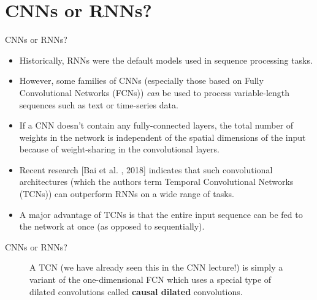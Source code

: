 \documentclass[11pt,compress,t,notes=noshow]{beamer}
\begin{document}
\section{CNNs or RNNs?}

\begin{frame} {CNNs or RNNs?}
  \begin{itemize}
    \item Historically, RNNs were the default models used in sequence processing tasks.
    \item However, some families of CNNs (especially those based on Fully Convolutional Networks (FCNs)) \textit{can} be used to process variable-length sequences such as text or time-series data.
    \item If a CNN doesn't contain any fully-connected layers, the total number of weights in the network is independent of the spatial dimensions of the input because of weight-sharing in the convolutional layers.
    \item Recent research [Bai et al. , 2018] indicates that such convolutional architectures (which the authors term Temporal Convolutional Networks (TCNs)) can outperform RNNs on a wide range of tasks.
    \item A major advantage of TCNs is that the entire input sequence can be fed to the network at once (as opposed to sequentially).
  \end{itemize}
\end{frame}

\begin{frame} {CNNs or RNNs?}
  \begin{figure}
      \centering
      \caption{\footnotesize{A TCN (we have already seen this in the CNN lecture!) is simply a variant of the one-dimensional FCN which uses a special type of dilated convolutions called \textbf{causal dilated} convolutions.}}
  \end{figure}
\end{frame}
\end{document}
